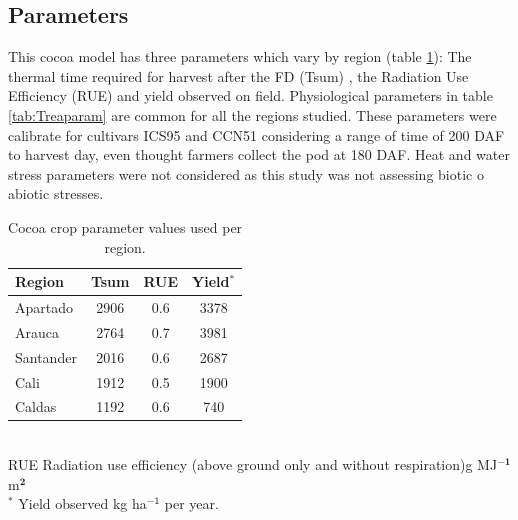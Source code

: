 \documentclass[gene,journal,article,submit,moreauthors,pdftex]{Definitions/mdpi}
\begin{document}
\subsection{Parameters}

This cocoa model has three parameters which vary by region (table \ref{tab:reparam}): The thermal time required for harvest after the FD (Tsum) , the Radiation Use Efficiency (RUE) and yield observed on field. Physiological parameters in table \ref{tab:Treaparam} are  common  for all the regions studied. These parameters were calibrate for cultivars ICS95 and CCN51 considering a range of time of 200 DAF to harvest day, even thought farmers collect the pod at 180 DAF. Heat and water stress parameters were not considered as this study was not assessing biotic o abiotic stresses.

\begin{table}[h!]	
	\caption {\footnotesize {Cocoa crop parameter values used per region.}}
	\label{tab:reparam} 
	\centering
	\begin{small}
		\begin{tabular}{l c c c }
			\hline
			{\bf Region }&{\bf Tsum }&{\bf RUE}&{\bf Yield$^{*}$}\\
			\hline
			Apartado   & 2906 & 0.6 & 3378  \\
			Arauca   & 2764 & 0.7 & 3981  \\
			Santander & 2016 &0.6 & 2687 \\
			Cali   & 1912 & 0.5 & 1900  \\
			Caldas   & 1192 & 0.6 & 740  \\
			\hline
		\end{tabular} \\
		{\footnotesize RUE Radiation use efficiency (above ground only and without respiration)g MJ$^{\mathbf{-1}}$ m$^{\mathbf{2}}$\\$^{*}$ Yield observed kg ha$^{\mathsf{-1}}$ per year. } 
	\end{small}
\end{table}
\end{document}

